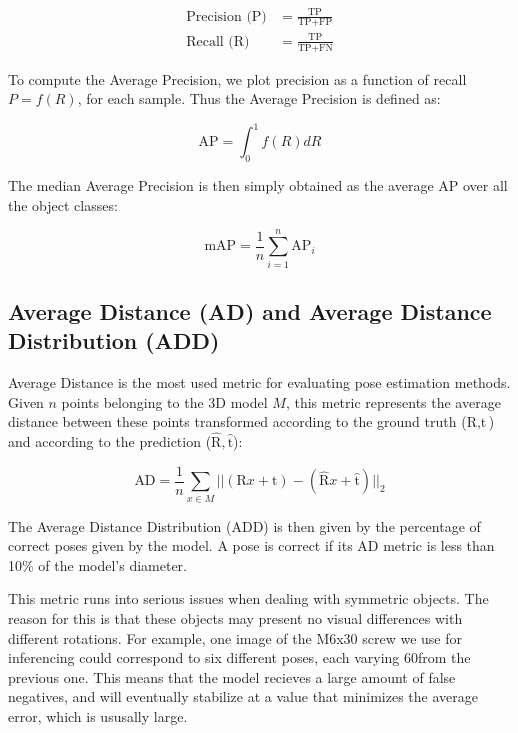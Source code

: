 \begin{align*}
    \text{Precision (P)} &= \frac{\text{TP}}{\text{TP} + \text{FP}}\\
    \text{Recall (R)} &= \frac{\text{TP}}{\text{TP} + \text{FN}}
\end{align*}

To compute the Average Precision, we plot precision as a function of recall $P = f(R)$, for each sample. Thus the Average Precision is defined as:

\begin{equation*}
    \text{AP} = \int_{0}^{1} f(R)dR
\end{equation*}

The median Average Precision is then simply obtained as the average AP over all the object classes:

\begin{equation*}
    \text{mAP} = \frac{1}{n} \sum_{i=1}^{n} \text{AP}_{i}
\end{equation*}

\subsection{Average Distance (AD) and Average Distance Distribution (ADD)}

Average Distance is the most used metric for evaluating pose estimation methods. Given $n$ points belonging to the 3D model $M$, this metric represents the average distance between these points transformed according to the ground truth ($\text{R}, \text{t}$) and according to the prediction ($\hat{\text{R}}, \hat{\text{t}}$):

\begin{equation*}
    \text{AD} = \frac{1}{n} \sum_{x \in M} ||(\text{R}x + \text{t}) - 
    (\hat{\text{R}}x + \hat{\text{t}})||_2
\end{equation*}

The Average Distance Distribution (ADD) is then given by the percentage of correct poses given by the model. A pose is correct if its AD metric is less than 10\% of the model's diameter.

This metric runs into serious issues when dealing with symmetric objects. The reason for this is that these objects may present no visual differences with different rotations. For example, one image of the M6x30 screw we use for inferencing could correspond to six different poses, each varying 60\degree from the previous one. This means that the model recieves a large amount of false negatives, and will eventually stabilize at a value that minimizes the average error, which is ususally large.

